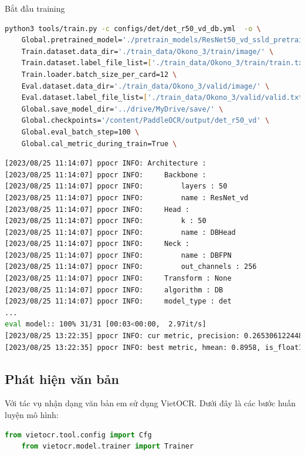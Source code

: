 Bắt đầu training 
\begin{lstlisting}[language=bash]
python3 tools/train.py -c configs/det/det_r50_vd_db.yml  -o \
    Global.pretrained_model='./pretrain_models/ResNet50_vd_ssld_pretrained.pdparams' \
    Train.dataset.data_dir='./train_data/Okono_3/train/image/' \
    Train.dataset.label_file_list=['./train_data/Okono_3/train/train.txt'] \
    Train.loader.batch_size_per_card=12 \
    Eval.dataset.data_dir='./train_data/Okono_3/valid/image/' \
    Eval.dataset.label_file_list=['./train_data/Okono_3/valid/valid.txt'] \
    Global.save_model_dir='../drive/MyDrive/save/' \
    Global.checkpoints='/content/PaddleOCR/output/det_r50_vd' \
    Global.eval_batch_step=100 \
    Global.cal_metric_during_train=True \
\end{lstlisting}
\begin{lstlisting}[language=bash]
[2023/08/25 11:14:07] ppocr INFO: Architecture : 
[2023/08/25 11:14:07] ppocr INFO:     Backbone : 
[2023/08/25 11:14:07] ppocr INFO:         layers : 50
[2023/08/25 11:14:07] ppocr INFO:         name : ResNet_vd
[2023/08/25 11:14:07] ppocr INFO:     Head : 
[2023/08/25 11:14:07] ppocr INFO:         k : 50
[2023/08/25 11:14:07] ppocr INFO:         name : DBHead
[2023/08/25 11:14:07] ppocr INFO:     Neck : 
[2023/08/25 11:14:07] ppocr INFO:         name : DBFPN
[2023/08/25 11:14:07] ppocr INFO:         out_channels : 256
[2023/08/25 11:14:07] ppocr INFO:     Transform : None
[2023/08/25 11:14:07] ppocr INFO:     algorithm : DB
[2023/08/25 11:14:07] ppocr INFO:     model_type : det
...
eval model:: 100% 31/31 [00:03<00:00,  2.97it/s]
[2023/08/25 13:22:35] ppocr INFO: cur metric, precision: 0.2653061224489796, recall: 0.17067833698030635, hmean: 0.20772303595206393, fps: 14.512030517908638
[2023/08/25 13:22:35] ppocr INFO: best metric, hmean: 0.8958, is_float16: False, start_epoch: 156, precision: 0.9292, recall: 0.8648, fps: 13.95, best_epoch: 280
\end{lstlisting}

\subsection{Phát hiện văn bản}
Với tác vụ nhận dạng văn bản em sử dụng VietOCR. Dưới đây là các bước huấn luyện mô hình:
\begin{lstlisting}[language=Python]
    from vietocr.tool.config import Cfg
    from vietocr.model.trainer import Trainer
\end{lstlisting}

